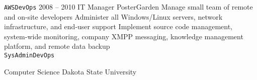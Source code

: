 \documentclass[10pt]{jvresume2020} %
\begin{document}
\begin{entrylist}
{{} \texttt{AWS}\slashsep\texttt{DevOps}}
	\entry
		{2008 -- 2010}
		{IT Manager}
		{PosterGarden}
		{{Manage small team of remote and on-site developers\linebreak
		Administer all Windows/Linux servers, network infrastructure, and end-user support\linebreak
		Implement source code management, system-wide monitoring, company XMPP messaging, knowledge management platform, and remote data backup\\
} \texttt{SysAdmin}\slashsep\texttt{DevOps}}
\end{entrylist}



\begin{entrylist}
	\entry
		{}
		{Computer Science}
		{Dakota State University}
		{\lorem\lorem\lorem}
\end{entrylist}
\end{document}
